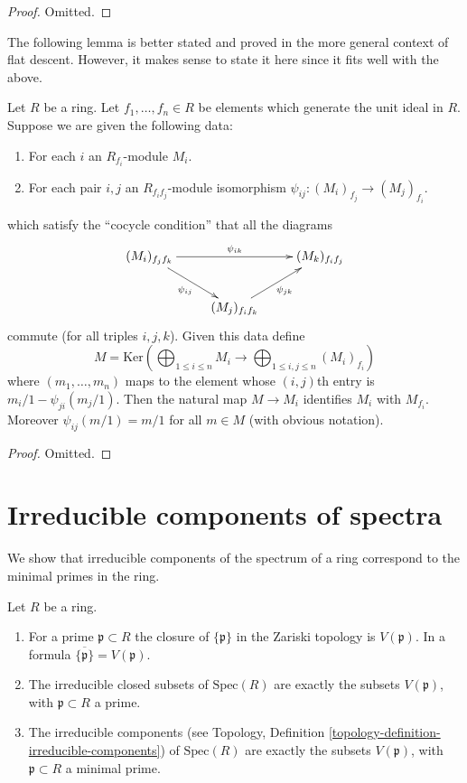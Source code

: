 \begin{proof}
Omitted.
\end{proof}

\noindent
The following lemma is better stated and proved in the more general
context of flat descent. However, it makes sense to state it here
since it fits well with the above.

\begin{lemma}
\label{lemma-glue-modules}
Let $R$ be a ring. Let $f_1, \ldots, f_n \in R$ be elements
which generate the unit ideal in $R$. Suppose we are given
the following data:
\begin{enumerate}
\item For each $i$ an $R_{f_i}$-module $M_i$.
\item For each pair $i, j$ an $R_{f_if_j}$-module isomorphism
$\psi_{ij} : (M_i)_{f_j} \to (M_j)_{f_i}$.
\end{enumerate}
which satisfy the ``cocycle condition'' that all the diagrams
$$
\xymatrix{
(M_i)_{f_jf_k}
\ar[rd]_{\psi_{ij}}
\ar[rr]^{\psi_{ik}}
& &
(M_k)_{f_if_j} \\
&
(M_j)_{f_if_k} \ar[ru]_{\psi_{jk}}
}
$$
commute (for all triples $i, j, k$). Given this data define
$$
M = \text{Ker}\left(
\bigoplus\nolimits_{1 \leq i \leq n} M_i
\longrightarrow
\bigoplus\nolimits_{1 \leq i, j \leq n} (M_i)_{f_i}
\right)
$$
where $(m_1, \ldots, m_n)$ maps to the element whose
$(i, j)$th entry is $m_i/1 - \psi_{ji}(m_j/1)$.
Then the natural map $M \to M_i$ identifies
$M_i$ with $M_{f_i}$. Moreover $\psi_{ij}(m/1) = m/1$
for all $m \in M$ (with obvious notation).
\end{lemma}

\begin{proof}
Omitted.
\end{proof}








\section{Irreducible components of spectra}
\label{section-irreducible}

\noindent
We show that irreducible components of
the spectrum of a ring correspond to the
minimal primes in the ring.

\begin{lemma}
\label{lemma-irreducible}
Let $R$ be a ring.
\begin{enumerate}
\item For a prime $\mathfrak p \subset R$ the closure
of $\{\mathfrak p\}$ in the Zariski topology is $V(\mathfrak p)$.
In a formula $\overline{\{\mathfrak p\}} = V(\mathfrak p)$.
\item The irreducible closed subsets of $\text{Spec}(R)$ are
exactly the subsets $V(\mathfrak p)$, with $\mathfrak p \subset R$
a prime.
\item The irreducible components (see Topology,
Definition \ref{topology-definition-irreducible-components})
of $\text{Spec}(R)$ are  exactly the subsets $V(\mathfrak p)$,
with $\mathfrak p \subset R$ a minimal prime.
\end{enumerate}
\end{lemma}

